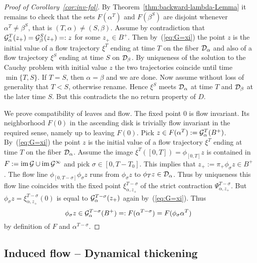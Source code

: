 \documentclass{article}
\begin{document}
\begin{proof}[Proof of Corollary~\ref{cor:inv-fol}]
By Theorem~\ref{thm:backward-lambda-Lemma}
it remains to check that the sets $F({\alpha^T})$
and $F(\beta^S)$ are disjoint whenever
${\alpha^T}\not=\beta^S$, that is
$(T,{\alpha})\not= (S,\beta)$.
Assume by contradiction that 
${\mathcal{G}}^T_{\alpha}(z_+)={\mathcal{G}}^S_\beta(z_+)=:z$ for some
$z_+\in B^+$. Then by~(\ref{eq:G=xi}) the
point $z$ is the initial value of a flow
trajectory $\xi^T$ ending at time $T$ on the fiber
${\mathcal{D}}_{\alpha}$ and also of a flow trajectory $\xi^S$
ending at time $S$ on ${\mathcal{D}}_{\beta}$.
By uniqueness of the solution to the Cauchy 
problem with initial value $z$
the two trajectories coincide until time $\min\{T,S\}$.
If $T=S$, then ${\alpha}=\beta$ and we are done.
Now assume without loss of generality that $T<S$, 
otherwise rename. Hence $\xi^S$ meets ${\mathcal{D}}_{\alpha}$
at time $T$ and ${\mathcal{D}}_\beta$ at the later time $S$.
But this contradicts the no return property of $D$.

We prove compatibility of leaves and flow. The
fixed point $0$ is flow invariant. Its
neighborhood $F(0)$ in the ascending disk is
trivially flow invariant in the required sense,
namely up to leaving $F(0)$.
Pick $z\in F({\alpha^T}):={\mathcal{G}}^T_{\alpha}(B^+)$.
By~(\ref{eq:G=xi}) the point $z$ is the initial value
of a flow trajectory $\xi^T$ ending at time $T$ on
the fiber ${\mathcal{D}}_{\alpha}$.
Assume the image $\xi^T([0,T])=\phi_{[0,T]} z$ is
contained in $F:={\rm im\, }{\mathcal{G}}\cup{\rm im\, }{\mathcal{G}}^\infty$ and pick
$\sigma\in[0,T-T_0]$. This implies that
$z_+:=\pi_+\phi_\sigma z\in B^+$. The
flow line $\phi_{[0,T-\sigma]}\phi_\sigma z$ runs
from $\phi_\sigma z$ to $\phi_T z\in {\mathcal{D}}_{\alpha}$.
Thus by uniqueness this flow line coincides with the
fixed point $\xi_{{\alpha},z_+}^{T-\sigma}$ of the strict
contraction $\Psi_{{\alpha},z_+}^{T-\sigma}$. But
$\phi_\sigma z=\xi_{{\alpha},z_+}^{T-\sigma}(0)$ is equal
to ${\mathcal{G}}^{T-\sigma}_{\alpha}(z_+)$ again
by~(\ref{eq:G=xi}). Thus
$$
     \phi_\sigma z\in
     {\mathcal{G}}^{T-\sigma}_{\alpha}(B^+)
     =:F({\alpha}^{T-\sigma})
     =F(\phi_\sigma{\alpha^T})
$$
by definition of $F$ and ${\alpha}^{T-\sigma}$.
\end{proof}


\subsection*{Induced flow -- Dynamical thickening}%
\end{document}
